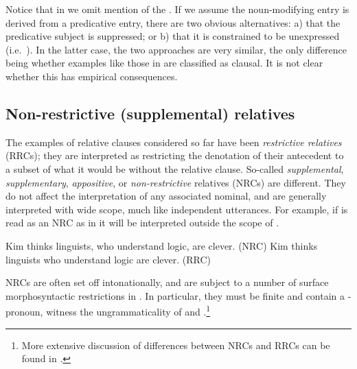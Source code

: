 \documentclass[output=paper
 	        ,biblatex
                ,babelshorthands
                ,newtxmath
                ,draftmode
                ,colorlinks, citecolor=brown
]{langscibook}
\begin{document}
Notice that in  we omit mention of the . If we assume the
noun-modifying entry is derived from a predicative entry, there are two obvious
alternatives: a) that the predicative subject is suppressed; or b) that it is constrained
to be unexpressed (i.e.\ ). In the latter case, the two approaches are very
similar, the only difference being whether examples like those in  are
classified as clausal. It is not clear whether this has empirical consequences.

\subsection{Non-restrictive (supplemental) relatives}
\label{sec:rc-non-restr-suppl}

The examples of relative clauses considered so far have been \emph{restrictive relatives} (RRCs); they are
interpreted as restricting the denotation of their antecedent to a subset of what
it would be without the relative clause. So-called \emph{supplemental}, \emph{supplementary}, \emph{appositive}, or \emph{non-restrictive}
relatives (NRCs) are different. They do not affect the interpretation of any associated
nominal, and are generally interpreted with wide scope, much like independent
utterances. For example, if  is read as an NRC as in 
it will be interpreted outside the scope of .
\begin{exe}\ex\begin{xlist}\label{x:rc-106}
  \ex\label{x:rc-107} Kim thinks linguists, who understand logic, are clever. \hfill (NRC)
  \ex\label{x:rc-108} Kim thinks linguists who understand logic are clever. \hfill (RRC)
\end{xlist}\end{exe}
NRCs are often set off intonationally, and are subject to a number of surface
morphosyntactic restrictions in .  In particular, they must be finite and contain a
-pronoun, witness the ungrammaticality of  and
.\footnote{More extensive discussion of differences between NRCs and RRCs can
  be found in \cite{Arnold07}.}
\begin{exe}\ex\begin{xlist}
\end{xlist}\end{exe}
\end{document}
